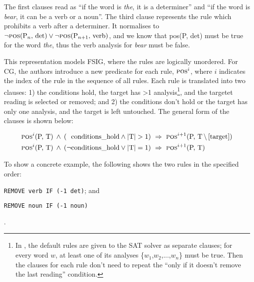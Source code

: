 \noindent The first clauses read as ``if the word is \emph{the}, it
is a determiner'' and ``if the word is \emph{bear}, it can be a verb or a noun''.
The third clause represents the rule which prohibits a verb after a
determiner. It normalises to $\neg \text{{\sc pos}(P$_n$, det)} \vee \neg \text{{\sc pos}(P$_{n+1}$, verb)}$, and we know that {\sc pos}(P, det) must be true for
the word \emph{the}, thus the verb analysis for \emph{bear} must be
false.

This representation models FSIG, where the rules are logically
unordered. For CG, the authors introduce a new predicate for each rule,
$\text{{\sc pos}}^i$, where $i$ indicates the index of the rule in the
sequence of all rules.
Each rule is translated into two
clauses: 1) the conditions hold, the target has >1 analysis\footnote{In \cite{listenmaa_claessen2015}, the default rules
  are given to the SAT solver as separate clauses; for every word
  $w$, at least one of its analyses \{$w_1$,$w_2$,...,$w_n$\} must be
  true. Then the clauses for each rule don't need to repeat the ``only
  if it doesn't remove the last reading'' condition.}, and the 
targetet reading is selected or removed; and
2) the conditions don't hold or the target has only one analysis, and the target is left untouched. The general form of the clauses is shown below:

\begin{align*}
\text{{\sc pos}}^i\text{(P, T)} \: \wedge \: (\;\:\,  \text{conditions\_hold}
\wedge  \text{|T|} > 1) \  &\Rightarrow \  \text{{\sc pos}}^{i+1}\text{(P, T$\,\setminus\,$[target])} \\
\text{{\sc pos}}^i\text{(P, T)} \: \wedge \: (\neg \text{conditions\_hold} \vee
\text{|T|} = 1) \  &\Rightarrow \ \text{{\sc pos}}^{i+1}\text{(P, T)}
\end{align*}


To show a concrete example, the following shows the two rules in the specified order:
\begin{inparaenum}
\def\labelenumi{\arabic{enumi}.}
\itemsep1pt\parskip0pt
\item \texttt{REMOVE verb IF (-1 det)}; and
\item  \texttt{REMOVE noun IF (-1 noun)}
\end{inparaenum}.

